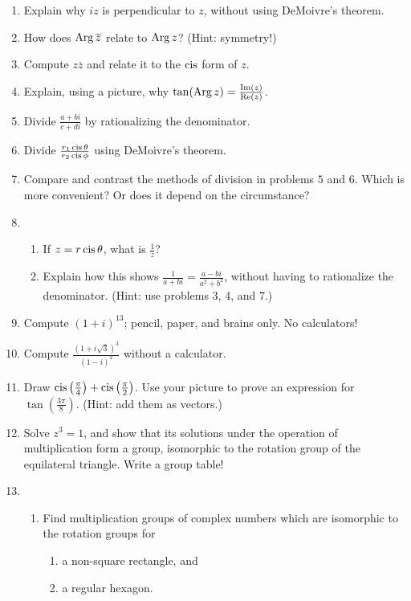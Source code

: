 \documentclass[../gatm.tex]{subfiles}
\begin{document}
\begin{enumerate}
\item Explain why $iz$ is perpendicular to $z$, without using DeMoivre's theorem.
\item How does $\operatorname{Arg} \overline{z}$ relate to $\operatorname{Arg} z$? (Hint: symmetry!)
\item Compute $z\overline{z}$ and relate it to the $\operatorname{cis}$ form of $z$.
\item Explain, using a picture, why $\tan (\operatorname{Arg} z) = \frac{\operatorname{Im}(z)}{\operatorname{Re}(z)}$.
\item Divide $\frac{a+bi}{c+di}$ by rationalizing the denominator.
\item Divide $\frac{r_1\operatorname{cis} \theta}{r_2\operatorname{cis} \phi}$ using DeMoivre's theorem.
\item Compare and contrast the methods of division in problems $5$ and $6$. Which is more convenient? Or does it depend on the circumstance?
\item \begin{enumerate}
\item If $z = r\operatorname{cis} \theta$, what is $\frac{1}{z}$?
\item Explain how this shows $\frac{1}{a+bi}=\frac{a-bi}{a^2+b^2}$, without having to rationalize the denominator. (Hint: use problems 3, 4, and 7.)
\end{enumerate}
\item Compute $(1+i)^{13}$; pencil, paper, and brains only. No calculators!
\item Compute $\frac{(1+i\sqrt{3})^3}{(1-i)^2}$ without a calculator.
\item Draw $\operatorname{cis}\left(\frac{\pi}{4}\right) + \operatorname{cis}\left(\frac{\pi}{2}\right)$. Use your picture to prove an expression for $\tan\left(\frac{3\pi}{8}\right)$. (Hint: add them as vectors.)
\item Solve $z^3 = 1$, and show that its solutions under the operation of multiplication form a group, isomorphic to the rotation group of the equilateral triangle. Write a group table!
\item \begin{enumerate}
\item Find multiplication groups of complex numbers which are isomorphic to the rotation groups for
\begin{multicols}{2}
\begin{enumerate}
\item a non-square rectangle, and
\item a regular hexagon.
\end{enumerate}

\end{multicols}
\end{enumerate}
\end{enumerate}
\end{document}
